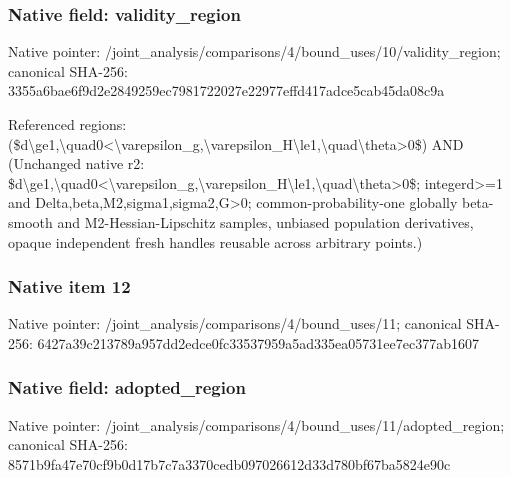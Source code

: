 \documentclass[10pt,a4paper]{article}
\begin{document}
\subsubsection{Native field: validity\_\allowbreak{}region}
Native pointer: /joint\_\allowbreak{}analysis/comparisons/4/bound\_\allowbreak{}uses/10/validity\_\allowbreak{}region; canonical SHA-256: 3355a6bae6f9d2e2849259ec7981722027e22977effd417adce5cab45da08c9a

\begingroup\raggedright\sloppy Referenced regions:\allowbreak{} (\$d\textbackslash{}ge1,\allowbreak{}\textbackslash{}quad0<\textbackslash{}varepsilon\_\allowbreak{}g,\allowbreak{}\textbackslash{}varepsilon\_\allowbreak{}H\textbackslash{}le1,\allowbreak{}\textbackslash{}quad\textbackslash{}theta>0\$) AND (Unchanged native r2:\allowbreak{} \$d\textbackslash{}ge1,\allowbreak{}\textbackslash{}quad0<\textbackslash{}varepsilon\_\allowbreak{}g,\allowbreak{}\textbackslash{}varepsilon\_\allowbreak{}H\textbackslash{}le1,\allowbreak{}\textbackslash{}quad\textbackslash{}theta>0\$;\allowbreak{} integerd>=\allowbreak{}1 and Delta,\allowbreak{}beta,\allowbreak{}M2,\allowbreak{}sigma1,\allowbreak{}sigma2,\allowbreak{}G>0;\allowbreak{} common-probability-one globally beta-smooth and M2-Hessian-Lipschitz samples,\allowbreak{} unbiased population derivatives,\allowbreak{} opaque independent fresh handles reusable across arbitrary points.)\par\endgroup

\subsubsection{Native item 12}
Native pointer: /joint\_\allowbreak{}analysis/comparisons/4/bound\_\allowbreak{}uses/11; canonical SHA-256: 6427a39c213789a957dd2edce0fc33537959a5ad335ea05731ee7ec377ab1607

\subsubsection{Native field: adopted\_\allowbreak{}region}
Native pointer: /joint\_\allowbreak{}analysis/comparisons/4/bound\_\allowbreak{}uses/11/adopted\_\allowbreak{}region; canonical SHA-256: 8571b9fa47e70cf9b0d17b7c7a3370cedb097026612d33d780bf67ba5824e90c
\end{document}
